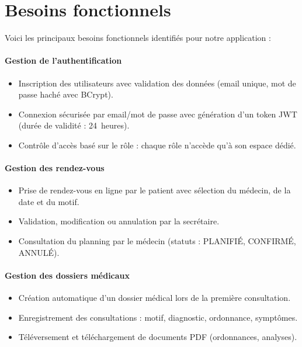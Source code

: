\documentclass[12pt,a4paper]{report}
\begin{document}
\section{Besoins fonctionnels}

Voici les principaux besoins fonctionnels identifiés pour notre application :

\paragraph{Gestion de l'authentification}
\begin{itemize}
    \item Inscription des utilisateurs avec validation des données (email unique,
    mot de passe haché avec BCrypt).
    \item Connexion sécurisée par email/mot de passe avec génération d'un token JWT
    (durée de validité : 24~heures).
    \item Contrôle d'accès basé sur le rôle : chaque rôle n'accède qu'à son espace
    dédié.
\end{itemize}

\paragraph{Gestion des rendez-vous}
\begin{itemize}
    \item Prise de rendez-vous en ligne par le patient avec sélection du médecin,
    de la date et du motif.
    \item Validation, modification ou annulation par la secrétaire.
    \item Consultation du planning par le médecin (statuts : PLANIFIÉ, CONFIRMÉ,
    ANNULÉ).
\end{itemize}

\paragraph{Gestion des dossiers médicaux}
\begin{itemize}
    \item Création automatique d'un dossier médical lors de la première consultation.
    \item Enregistrement des consultations : motif, diagnostic, ordonnance, symptômes.
    \item Téléversement et téléchargement de documents PDF (ordonnances, analyses).
\end{itemize}
\end{document}
